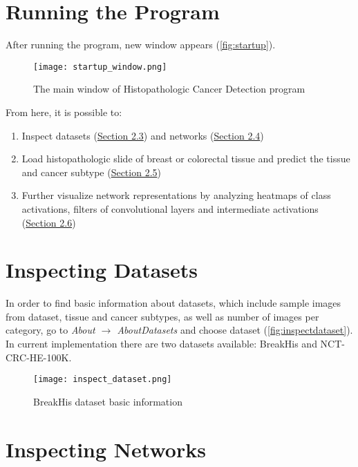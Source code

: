 \section{Running the Program}

After running the program, new window appears (\textcolor{red}{\autoref{fig:startup}}).

\begin{figure}[h]
	\hspace*{0.5cm}
	\centering
	\texttt{[image: startup\_window.png]}
	\caption{The main window of Histopathologic Cancer Detection program}
	\label{fig:startup}
\end{figure}

From here, it is possible to:
\begin{enumerate}
	\itemsep 0em
	\item Inspect datasets (\textcolor{red}{\hyperref[inspdata]{Section 2.3}}) and networks (\textcolor{red}{\hyperref[inspnets]{Section 2.4}})
	\item Load histopathologic slide of breast or colorectal tissue and predict the tissue and cancer subtype (\textcolor{red}{\hyperref[basicuse]{Section 2.5}})
	\item Further visualize network representations by analyzing heatmaps of class activations, filters of convolutional layers and intermediate activations\\ (\textcolor{red}{\hyperref[advuse]{Section 2.6}})
\end{enumerate}
\clearpage

\section{Inspecting Datasets}
\label{inspdata}

In order to find basic information about datasets, which include sample images from dataset, tissue and cancer subtypes, as well as number of images per category, go to \emph{About $\rightarrow$ About\;Datasets} and choose dataset (\textcolor{red}{\autoref{fig:inspectdataset}}). In current implementation there are two datasets available: BreakHis and NCT-CRC-HE-100K.

\begin{figure}[h]
	\centering
	\texttt{[image: inspect\_dataset.png]}
	\caption{BreakHis dataset basic information}
	\label{fig:inspectdataset}
\end{figure}

\section{Inspecting Networks}
\label{inspnets}

